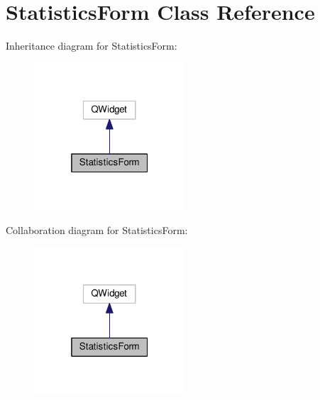 \hypertarget{class_statistics_form}{}\section{Statistics\+Form Class Reference}
\label{class_statistics_form}


Inheritance diagram for Statistics\+Form\+:
\nopagebreak
\begin{figure}[H]
\begin{center}
\leavevmode
\includegraphics[width=160pt]{class_statistics_form__inherit__graph}
\end{center}
\end{figure}


Collaboration diagram for Statistics\+Form\+:
\nopagebreak
\begin{figure}[H]
\begin{center}
\leavevmode
\includegraphics[width=160pt]{class_statistics_form__coll__graph}
\end{center}
\end{figure}
